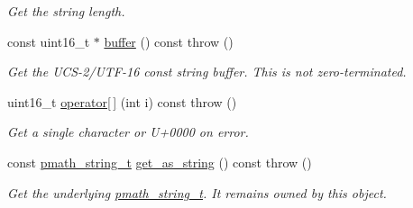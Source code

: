 \begin{CompactItemize}
\begin{CompactList}\small\item\em Get the string length. \item\end{CompactList}\item 
\hypertarget{classpmath_1_1_string_69c9a4b00d70a9fbfc51e5d855e6a55f}{
const uint16\_\-t $\ast$ \hyperlink{classpmath_1_1_string_69c9a4b00d70a9fbfc51e5d855e6a55f}{buffer} () const   throw ()}
\label{classpmath_1_1_string_69c9a4b00d70a9fbfc51e5d855e6a55f}

\begin{CompactList}\small\item\em Get the UCS-2/UTF-16 const string buffer. This is not zero-terminated. \item\end{CompactList}\item 
\hypertarget{classpmath_1_1_string_8f03d3786169a6ac3007beb1b9e9c7c0}{
uint16\_\-t \hyperlink{classpmath_1_1_string_8f03d3786169a6ac3007beb1b9e9c7c0}{operator\mbox{[}$\,$\mbox{]}} (int i) const   throw ()}
\label{classpmath_1_1_string_8f03d3786169a6ac3007beb1b9e9c7c0}

\begin{CompactList}\small\item\em Get a single character or U+0000 on error. \item\end{CompactList}\item 
\hypertarget{classpmath_1_1_string_95a5455be878180bc10d2f69b0ea8552}{
const \hyperlink{classpmath__string__t}{pmath\_\-string\_\-t} \hyperlink{classpmath_1_1_string_95a5455be878180bc10d2f69b0ea8552}{get\_\-as\_\-string} () const   throw ()}
\label{classpmath_1_1_string_95a5455be878180bc10d2f69b0ea8552}

\begin{CompactList}\small\item\em Get the underlying \hyperlink{classpmath__string__t}{pmath\_\-string\_\-t}. It remains owned by this object. \item\end{CompactList}\end{CompactItemize}
